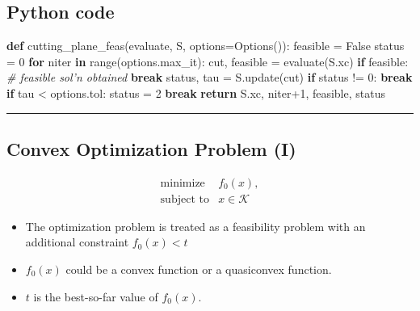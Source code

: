 \documentclass[]{article}
\newenvironment{Shaded}{}{}
\newcommand{\BuiltInTok}[1]{#1}
\newcommand{\CommentTok}[1]{\textcolor[rgb]{0.38,0.63,0.69}{\textit{#1}}}
\newcommand{\ControlFlowTok}[1]{\textcolor[rgb]{0.00,0.44,0.13}{\textbf{#1}}}
\newcommand{\DecValTok}[1]{\textcolor[rgb]{0.25,0.63,0.44}{#1}}
\newcommand{\KeywordTok}[1]{\textcolor[rgb]{0.00,0.44,0.13}{\textbf{#1}}}
\newcommand{\NormalTok}[1]{#1}
\newcommand{\OperatorTok}[1]{\textcolor[rgb]{0.40,0.40,0.40}{#1}}
\newcommand{\VariableTok}[1]{\textcolor[rgb]{0.10,0.09,0.49}{#1}}
\begin{document}
\hypertarget{python-code}{%
\subsection{Python code}\label{python-code}}

\begin{Shaded}
\begin{Highlighting}[]
\KeywordTok{def}\NormalTok{ cutting_plane_feas(evaluate, S, options}\OperatorTok{=}\NormalTok{Options()):}
\NormalTok{    feasible }\OperatorTok{=} \VariableTok{False}
\NormalTok{    status }\OperatorTok{=} \DecValTok{0}
    \ControlFlowTok{for}\NormalTok{ niter }\KeywordTok{in} \BuiltInTok{range}\NormalTok{(options.max_it):}
\NormalTok{        cut, feasible }\OperatorTok{=}\NormalTok{ evaluate(S.xc)}
        \ControlFlowTok{if}\NormalTok{ feasible:  }\CommentTok{# feasible sol'n obtained}
            \ControlFlowTok{break}
\NormalTok{        status, tau }\OperatorTok{=}\NormalTok{ S.update(cut)}
        \ControlFlowTok{if}\NormalTok{ status }\OperatorTok{!=} \DecValTok{0}\NormalTok{:}
            \ControlFlowTok{break}
        \ControlFlowTok{if}\NormalTok{ tau }\OperatorTok{<}\NormalTok{ options.tol:}
\NormalTok{            status }\OperatorTok{=} \DecValTok{2}
            \ControlFlowTok{break}
    \ControlFlowTok{return}\NormalTok{ S.xc, niter}\OperatorTok{+}\DecValTok{1}\NormalTok{, feasible, status}
\end{Highlighting}
\end{Shaded}

\begin{center}\rule{0.5\linewidth}{\linethickness}\end{center}

\hypertarget{convex-optimization-problem-i}{%
\subsection{Convex Optimization Problem
(I)}\label{convex-optimization-problem-i}}

\[\begin{array}{ll}
    \text{minimize}     & f_0(x), \\
    \text{subject to}   & x \in \mathcal{K}
\end{array}\]

\begin{itemize}
\item
  The optimization problem is treated as a feasibility problem with an
  additional constraint \(f_0(x) < t\)
\item
  \(f_0(x)\) could be a convex function or a quasiconvex function.
\item
  \(t\) is the best-so-far value of \(f_0(x)\).
\end{itemize}
\end{document}
